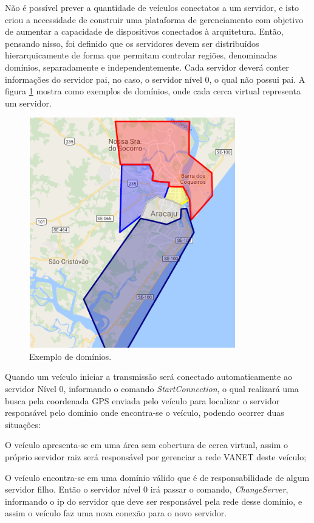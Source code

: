 \documentclass[
	12pt,				%
	oneside,			%
	a4paper,			%
	english,			%
	brazil				%
	]{abntex2ppgsi}
\begin{document}
Não é possível prever a quantidade de veículos conectatos a um servidor, e isto criou a necessidade de construir uma plataforma de gerenciamento com objetivo de aumentar a capacidade de dispositivos conectados à arquitetura. Então, pensando nisso, foi definido que os servidores devem ser distribuídos hierarquicamente de forma que permitam controlar regiões, denominadas domínios, separadamente e independentemente. Cada servidor deverá conter informações do servidor pai, no caso, o servidor nível 0, o qual  não possui pai. A figura \ref{fig:dDominios} mostra como exemplos de domínios, onde cada cerca virtual representa um servidor.

\begin{figure}[h!]
	\centering
	\includegraphics [width=9cm,height=10cm] {images/dominios.png}
	\caption{Exemplo de domínios.}
	\label{fig:dDominios}
\end{figure}


Quando um veículo iniciar a transmissão será conectado automaticamente ao servidor Nível 0, informando o comando \textit{StartConnection}, o qual realizará uma busca pela coordenada GPS enviada pelo veículo para localizar o servidor responsável pelo domínio onde encontra-se o veículo, podendo ocorrer duas situações:
\begin{enumerate*}
	\item{O veículo apresenta-se em uma área sem cobertura de cerca virtual, assim  o próprio servidor raiz será responsável por gerenciar a rede VANET deste veículo;}
	\item{O veículo encontra-se em uma domínio válido que é de responsabilidade de algum servidor filho. Então o servidor nível 0 irá passar o comando,  \textit{ChangeServer},  informando o ip do servidor que deve ser responsável pela rede desse domínio,  e assim o veículo faz uma nova conexão para o novo servidor.}
\end{enumerate*}
 
\end{document}
